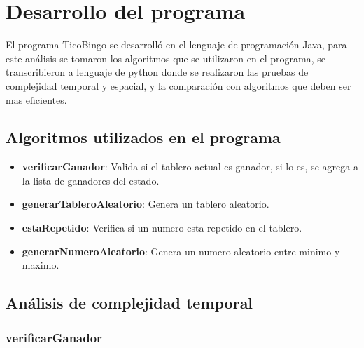 \documentclass[10pt,twocolumn]{article}
\begin{document}
\section{Desarrollo del programa}

El programa TicoBingo se desarrolló en el lenguaje de programación Java, para este análisis se tomaron los algoritmos que se utilizaron en el programa, se transcribieron a lenguaje de python donde se realizaron las pruebas de complejidad temporal y espacial, y la comparación con algoritmos que deben ser mas eficientes.

\subsection{Algoritmos utilizados en el programa}
\begin{itemize}
\item \textbf{verificarGanador}: Valida si el tablero actual es ganador, si lo es, se agrega a la lista de ganadores del estado.
\item \textbf{generarTableroAleatorio}: Genera un tablero aleatorio.
\item \textbf{estaRepetido}: Verifica si un numero esta repetido en el tablero.
\item \textbf{generarNumeroAleatorio}: Genera un numero aleatorio entre minimo y maximo.

\end{itemize}


\subsection{Análisis de complejidad temporal}

\subsubsection{verificarGanador}
\end{document}

